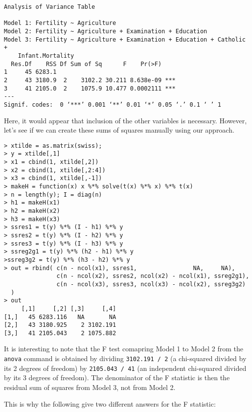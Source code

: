 \begin{verbatim}
Analysis of Variance Table

Model 1: Fertility ~ Agriculture
Model 2: Fertility ~ Agriculture + Examination + Education
Model 3: Fertility ~ Agriculture + Examination + Education + Catholic + 
    Infant.Mortality
  Res.Df    RSS Df Sum of Sq      F    Pr(>F)    
1     45 6283.1                                  
2     43 3180.9  2    3102.2 30.211 8.638e-09 ***
3     41 2105.0  2    1075.9 10.477 0.0002111 ***
---
Signif. codes:  0 ‘***’ 0.001 ‘**’ 0.01 ‘*’ 0.05 ‘.’ 0.1 ‘ ’ 1
\end{verbatim}

Here, it would appear that inclusion of the other variables is necessary.
However, let's see if we can create these sums of squares manually using our
approach.

\begin{verbatim}
> xtilde = as.matrix(swiss);
> y = xtilde[,1]
> x1 = cbind(1, xtilde[,2])
> x2 = cbind(1, xtilde[,2:4])
> x3 = cbind(1, xtilde[,-1])
> makeH = function(x) x %*% solve(t(x) %*% x) %*% t(x)
> n = length(y); I = diag(n)
> h1 = makeH(x1)
> h2 = makeH(x2)
> h3 = makeH(x3)
> ssres1 = t(y) %*% (I - h1) %*% y
> ssres2 = t(y) %*% (I - h2) %*% y
> ssres3 = t(y) %*% (I - h3) %*% y
> ssreg2g1 = t(y) %*% (h2 - h1) %*% y
>ssreg3g2 = t(y) %*% (h3 - h2) %*% y
> out = rbind( c(n - ncol(x1), ssres1,                NA,     NA),
               c(n - ncol(x2), ssres2, ncol(x2) - ncol(x1), ssreg2g1),
               c(n - ncol(x3), ssres3, ncol(x3) - ncol(x2), ssreg3g2)
  )
> out
     [,1]     [,2] [,3]     [,4]
[1,]   45 6283.116   NA       NA
[2,]   43 3180.925    2 3102.191
[3,]   41 2105.043    2 1075.882
\end{verbatim}
It is interesting to note that the F test comapring Model 1 to Model 2 from the \texttt{anova} command
is obtained by dividing \texttt{3102.191 / 2} (a chi-squared divided by its 2 degrees of freedom)
by \texttt{2105.043 / 41} (an independent chi-squared divided by its 3 degrees of freedom). The
denominator of the F statistic is then the residual sum of squares from Model 3, not from Model 2.

This is why the following give two different answers for the F statistic:

